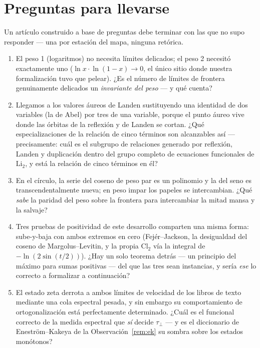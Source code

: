 \documentclass[11pt]{article}
\newcommand{\Li}{\mathrm{Li}_2}
\newcommand{\Cl}{\mathrm{Cl}_2}
\begin{document}
\section*{Preguntas para llevarse}

Un art\'iculo construido a base de preguntas debe terminar con las que no supo
responder --- una por estaci\'on del mapa, ninguna ret\'orica.

\begin{enumerate}
\item[\textbf{Sobre P1.}] El peso 1 (logaritmos) no necesita l\'imites delicados; el
peso 2 necesit\'o exactamente uno ($\ln x\cdot\ln(1-x)\to0$, el \'unico sitio donde
nuestra formalizaci\'on tuvo que pelear). ¿Es el n\'umero de l\'imites de frontera
genuinamente delicados un \emph{invariante del peso} --- y qu\'e cuenta?

\item[\textbf{Sobre P2.}] Llegamos a los valores \'aureos de Landen sustituyendo una
identidad de dos variables (la de Abel) por tres de una variable, porque el punto
\'aureo vive donde las \'orbitas de la reflexi\'on y de Landen se cortan. ¿Qu\'e
especializaciones de la relaci\'on de cinco t\'erminos son alcanzables as\'i ---
precisamente: cu\'al es el subgrupo de relaciones generado por reflexi\'on, Landen y
duplicaci\'on dentro del grupo completo de ecuaciones funcionales de $\Li$, y est\'a la
relaci\'on de cinco t\'erminos en \'el?

\item[\textbf{Sobre P3.}] En el c\'irculo, la serie del coseno de peso par es un
polinomio y la del seno es transcendentalmente nueva; en peso impar los papeles se
intercambian. ¿Qu\'e \emph{sabe} la paridad del peso sobre la frontera para
intercambiar la mitad mansa y la salvaje?

\item[\textbf{Sobre P4.}] Tres pruebas de positividad de este desarrollo comparten una
misma forma: sube-y-baja con ambos extremos en cero (Fej\'er--Jackson, la desigualdad
del coseno de Margolus--Levitin, y la propia $\Cl$ v\'ia la integral de
$-\ln(2\sin(t/2))$). ¿Hay un solo teorema detr\'as --- un principio del m\'aximo para
sumas positivas --- del que las tres sean instancias, y ser\'ia \emph{ese} lo correcto
a formalizar a continuaci\'on?

\item[\textbf{Sobre P5.}] El estado zeta derrota a ambos l\'imites de velocidad de los
libros de texto mediante una cola espectral pesada, y sin embargo su comportamiento de
ortogonalizaci\'on est\'a perfectamente determinado. ¿Cu\'al es el funcional correcto
de la medida espectral que \emph{s\'i} decide $\tau_\perp$ --- y es el diccionario de
Enestr\"om--Kakeya de la Observaci\'on~\ref{rem:ek} su sombra sobre los estados
mon\'otonos?
\end{enumerate}
\end{document}
